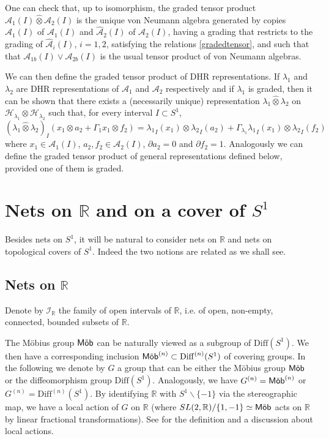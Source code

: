 \documentclass[11pt]{article}
\def\setminus{\smallsetminus}
\def\A{{\cal A}}
\def\I{{\cal I}}
\def\H{{\cal H}}
\def\Diff{{\rm Diff}}
\def\Mob{{\rm\textsf{M\"ob}}}
\def\setminus{\smallsetminus}
\def\Diff{{\mathrm {Diff}}}
\def\A{{\mathcal A}}
\def\H{{\mathcal H}}
\def\I{{\mathcal I}}
\begin{document}
One can check that, up to isomorphism, the graded tensor product 
$\A_1(I)\hat\otimes\A_2(I)$ is the unique von Neumann algebra generated by copies
 $\hat\A_1(I)$ of $\A_1(I)$ and $\hat\A_2(I)$ of $\A_2(I)$, having 
a grading that restricts to the grading of $\hat\A_i(I)$, $i=1,2$,
satisfying the relations \eqref{gradedtensor}, and such that that $\A_{1b}(I)\vee\A_{2b}(I)$ is the usual tensor product of von Neumann algebras.

We can then define the graded tensor product of DHR representations. 
If $\lambda_1$ and $\lambda_2$ are DHR representations of $\A_1$ and $\A_2$ 
respectively and if $\lambda_1$ is graded, then it can be shown that there 
exists a (necessarily unique) representation $\lambda_1 \hat\otimes \lambda_2$ on 
$\H_{\lambda_1} \otimes \H_{\lambda_2}$ such that, for every interval 
$I\subset S^1$,  
\[
(\lambda_1 \hat\otimes \lambda_2)_I (x_1\otimes a_2+
\Gamma_1x_1 \otimes f_2) = {\lambda_1}_I(x_1)\otimes {\lambda_2}_I(a_2)
+\Gamma_{\lambda_1}{\lambda_1}_I(x_1)\otimes {\lambda_2}_I(f_2)
\]
where $x_1\in \A_1(I)$, $a_2,f_2\in\A_2(I)$, $\partial a_2 =0$ and $\partial 
f_2=1$. 
Analogously we can 
define the graded tensor product of general representations defined below, 
provided one of them is graded.
%
\section{Nets on $\mathbb R$ and on a cover of $S^1$}
Besides nets on $S^1$, it will be natural to consider nets on $\mathbb R$ and nets on topological covers of $S^1$. Indeed the two notions are related as we shall see.
%
\subsection{Nets on $\mathbb R$}
\label{netR}
Denote by $\I_{\mathbb R}$ the family of open intervals of $\mathbb R$, 
i.e. of open, non-empty, connected, bounded subsets of $\mathbb R$. 

The M\"obius group $\Mob$ can be naturally viewed as a subgroup of $\Diff(S^1)$. We then have a corresponding inclusion $\Mob^{(n)}\subset\Diff^{(n)}(S^1)$ of covering groups. In the following we denote by $G$ a group that can be either the M\"obius group $\Mob$  or the diffeomorphism group $\Diff(S^1)$. Analogously, we have $G^{(n)}=\Mob^{(n)}$ or
$G^{(n)}=\Diff^{(n)}(S^1)$.
By identifying $\mathbb R$ with $S^1\!\setminus\!\{-1\}$ via the stereographic 
map, we have a local action of $G$ on $\mathbb R$
(where $SL(2,\mathbb R)/\{1,-1\}\simeq\Mob$ acts on $\mathbb R$ by linear fractional transformations). See \cite{BGL,GL5} for the definition and  a discussion about local actions. 
\end{document}
